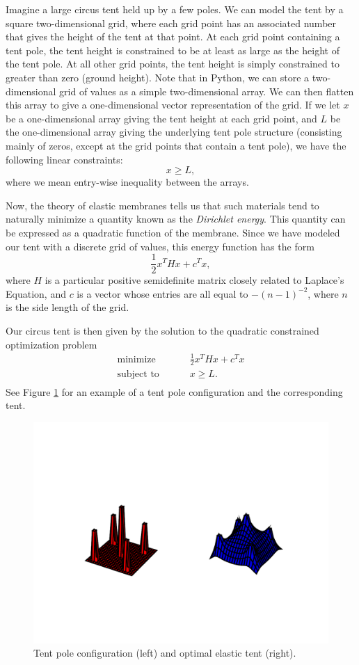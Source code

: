 Imagine a large circus tent held up by a few poles. We can model the tent by a square two-dimensional grid,
where each grid point has an associated number that gives the height of the tent at that point. At each
grid point containing a tent pole, the tent height is constrained to be at least as large as the height of
the tent pole. At all other grid points, the tent height is simply constrained to greater than zero (ground height).
Note that in Python, we can store a two-dimensional grid of values as a simple two-dimensional array.
We can then flatten this array to give a one-dimensional vector representation of the grid.
If we let $x$ be a one-dimensional array giving the tent height at each grid point, and $L$ be the one-dimensional
array giving the underlying tent pole structure (consisting mainly of zeros, except at the grid points that contain
a tent pole), we have the following linear constraints:
\[
x \geq L,
\]
where we mean entry-wise inequality between the arrays.

Now, the theory of elastic membranes tells us that such materials tend to naturally minimize a quantity known
as the \emph{Dirichlet energy}. This quantity can be expressed as a quadratic function of the membrane.
Since we have modeled our tent with a discrete grid of values, this energy function has the form
\[
\frac{1}{2}x^T H x + c^T x,
\]
where $H$ is a particular positive semidefinite matrix closely related to Laplace's Equation, and $c$ is a
vector whose entries are all equal to $-(n-1)^{-2}$, where $n$ is the side length of the grid.

Our circus tent is then given by the solution to the quadratic constrained optimization problem
\begin{align*}
\text{minimize }\qquad &\frac{1}{2}x^T H x + c^T x\\
\text{subject to }\qquad &x \geq L.\\
\end{align*}
See Figure \ref{fig:tent} for an example of a tent pole configuration and the corresponding tent.

\begin{figure}
\centering
\includegraphics[width=\textwidth]{tent.pdf}
\caption{Tent pole configuration (left) and optimal elastic tent (right).}
\label{fig:tent}
\end{figure}

